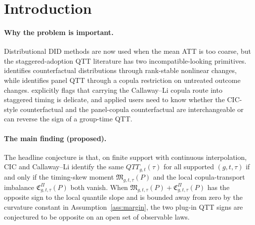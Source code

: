 \documentclass[11pt]{article}
\theoremstyle{definition}
\theoremstyle{plain}
\theoremstyle{remark}
\begin{document}
\begin{abstract}
This proposal asks when the Athey--Imbens changes-in-changes counterfactual and the Callaway--Li panel quantile DID counterfactual agree for group-time QTT in staggered adoption. The proposed kernel is a necessary-and-sufficient finite-support equivalence conjecture: the two counterfactual quantiles agree for every cohort-time cell exactly when a named timing-skew moment and an independently defined local copula-transport imbalance both vanish. The same pair of operational quantities is conjectured to generate an open class of non-degenerate observable laws on which the CIC and Callaway--Li plug-in QTT signs are opposite at a fixed quantile. If true, the result would turn Li--Lin's abstract and concluding warning about staggered Callaway--Li copula extensions into a computable diagnostic and would give joint point identification of group-time and aggregate QTT under timing homogeneity. The proposal is honest about status: the two-period reduction is a routine theorem, while the finite-support iff and open-set sign-reversal statements remain conjectures.
\end{abstract}

\section{Introduction}
\paragraph{Why the problem is important.}
Distributional DID methods are now used when the mean ATT is too coarse, but the staggered-adoption QTT literature has two incompatible-looking primitives. \citet{AtheyImbens2006} identifies counterfactual distributions through rank-stable nonlinear changes, while \citet{CallawayLi2019} identifies panel QTT through a copula restriction on untreated outcome changes. \citet{LiLin2024} explicitly flags that carrying the Callaway--Li copula route into staggered timing is delicate, and applied users need to know whether the CIC-style counterfactual and the panel-copula counterfactual are interchangeable or can reverse the sign of a group-time QTT.

\paragraph{The main finding (proposed).}
The headline conjecture is that, on finite support with continuous interpolation, CIC and Callaway--Li identify the same \(QTT_{g,t}(\tau)\) for all supported \((g,t,\tau)\) if and only if the timing-skew moment \(\mathfrak M_{g,t,\tau}(P)\) and the local copula-transport imbalance \(\mathfrak C^{\Pi}_{g,t,\tau}(P)\) both vanish. When \(\mathfrak M_{g,t,\tau}(P)+\mathfrak C^{\Pi}_{g,t,\tau}(P)\) has the opposite sign to the local quantile slope and is bounded away from zero by the curvature constant in Assumption~\ref{ass:margin}, the two plug-in QTT signs are conjectured to be opposite on an open set of observable laws.
\end{document}
